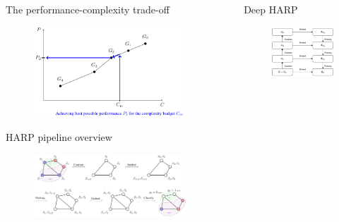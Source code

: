 \documentclass{beamer}
\newlength{\sepwidth}
\newlength{\colwidth}
\newcommand{\separatorcolumn}{\begin{column}{\sepwidth}\end{column}}
\begin{document}
\begin{frame}[t]
\begin{columns}[t]
\begin{column}{\colwidth}
\begin{block}{The performance-complexity trade-off}
			\begin{figure}
				\includegraphics[width=0.7\linewidth]{images/performance-complexity/performance-complexity.pdf}
			\end{figure}
		\end{block}

		\begin{block}{HARP pipeline overview}
			\begin{figure}
				\includegraphics[width=\linewidth]{images/harp-overview/harp-overview.pdf}
			\end{figure}
		\end{block}
	\end{column}

	\separatorcolumn

	\begin{column}{\colwidth}
		\begin{block}{Deep HARP}
			\begin{figure}
				\includegraphics[width=0.5\linewidth]{images/deep-harp/deep-harp.pdf}
			\end{figure}
		\end{block}


\end{column}
\end{columns}
\end{frame}
\end{document}
